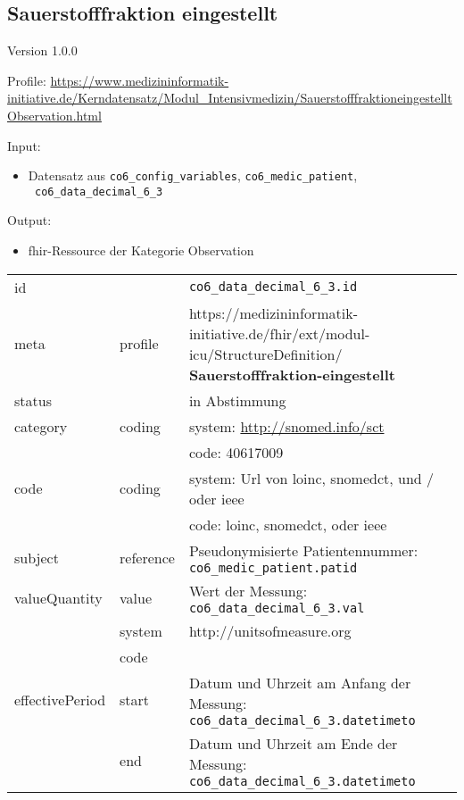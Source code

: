 \subsection{Sauerstofffraktion eingestellt} 
\noindent Version 1.0.0

\noindent Profile: \url{https://www.medizininformatik-initiative.de/Kerndatensatz/Modul_Intensivmedizin/SauerstofffraktioneingestelltObservation.html}

\noindent Input:
\begin{itemize}
	\item Datensatz aus \texttt{co6\_config\_variables}, \texttt{co6\_medic\_patient}, \\ \texttt{
co6\_data\_decimal\_6\_3}
\end{itemize}
Output:
\begin{itemize}
        \item \ac{fhir}-Ressource der Kategorie \glqq Observation\grqq{}
\end{itemize}
\begin{longtable}{|l|l|p{7.5cm}|}
        \hline
        \rowcolor{lightgray} \multicolumn{3}{|l|}{Data Mapping (inhaltlich)} \\ \hline
        id &  & \texttt{co6\_data\_decimal\_6\_3.id} \\ \hline
	meta & profile & https://medizininformatik-initiative.de/fhir/ext/modul-icu/StructureDefinition/\textbf{
Sauerstofffraktion-eingestellt} \\ \hline 
	status &  & in Abstimmung  \\ \hline 
	category & coding & system: \url{http://snomed.info/sct} \\
\cline{3-3}
	& & code: 40617009 \\ \hline
	code & coding & system: Url von \ac{loinc}, \ac{snomedct}, und / oder \ac{ieee} \\ 
	\cline{3-3} 
	 &  & code: \ac{loinc}, \ac{snomedct}, oder \ac{ieee} \\ \hline
	subject & reference & Pseudonymisierte Patientennummer: \texttt{co6\_medic\_patient.patid} \\ \hline
	valueQuantity & value & Wert der Messung: \texttt{
co6\_data\_decimal\_6\_3.val} \\
        \cline{2-3}
         & system & http://unitsofmeasure.org \\
         \cline{2-3}
         & code & \\ \hline
    effectivePeriod & start & Datum und Uhrzeit am Anfang der Messung: \texttt{
co6\_data\_decimal\_6\_3.datetimeto} \\
    \cline{2-3}
     & end & Datum und Uhrzeit am Ende der Messung: \texttt{
co6\_data\_decimal\_6\_3.datetimeto} \\ \hline
\end{longtable}


